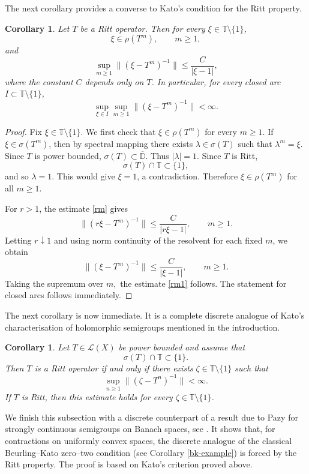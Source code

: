 \documentclass[11pt]{amsart}
\numberwithin{equation}{section}
\newtheorem{corollary}[theorem]{Corollary}
\theoremstyle{definition}
\theoremstyle{plain}
\def\T{\mathbb{T}}
\def\L{L}
\renewcommand{\L}{\mathcal L}
\begin{document}
 The next corollary provides a converse to Kato's condition for the Ritt property.
\begin{corollary}\label{ritt_converse}
Let $T$ be a Ritt operator. 
Then for every $\xi\in\mathbb T \setminus\{1\}$,
\[
  \xi\in\rho (T^m),\qquad m\ge1,
\]
and
\begin{equation}\label{rm1}
  \sup_{m\ge1}\|(\xi -T^m)^{-1}\|
  \le \frac{C}{|\xi-1|},
\end{equation}
where the constant $C$ depends only on $T$. In particular, for
every closed arc $I\subset\mathbb T\setminus\{1\}$,
\[
  \sup_{\xi\in I}\sup_{m\ge1}\|(\xi -T^m)^{-1}\|<\infty .
\]
\end{corollary}
\begin{proof}
Fix $\xi\in\mathbb T \setminus\{1\}$. We first check that
$\xi\in\rho (T^m)$ for every $m\ge1$. If
$\xi\in\sigma(T^m)$, then by spectral mapping there exists
$\lambda\in\sigma(T)$ such that
\(
  \lambda^m=\xi .
\)
Since $T$ is power bounded, $\sigma(T)\subset\overline{\mathbb D}$.
Thus $|\lambda|=1$. Since $T$ is Ritt,
\[
  \sigma(T)\cap\mathbb T \subset\{1\},
\]
and so $\lambda=1$. This would give $\xi=1$, a contradiction.
Therefore $\xi\in\rho (T^m)$ for all $m\ge1$.

For $r>1$, the estimate \eqref{rm} gives
\[
  \|(r\xi -T^m)^{-1}\|
  \le \frac{C}{|r\xi-1|},
  \qquad m\ge1.
\]
Letting $r\downarrow1$ and using norm continuity of the resolvent for
each fixed $m$, we obtain
\[
  \|(\xi -T^m)^{-1}\|
  \le \frac{C}{|\xi-1|},
  \qquad m\ge1.
\]
Taking the supremum over $m,$  the estimate \eqref{rm1} follows. The statement
for closed arcs follows immediately.
\end{proof}

The next corollary is now immediate. It is a complete discrete analogue of Kato's
characterisation of holomorphic semigroups mentioned in the introduction.

\begin{corollary}\label{DisKato}
Let $T\in\L(X)$ be power bounded and assume that
\[
        \sigma(T)\cap\T\subset\{1\}.
\]
Then $T$ is a Ritt operator if and only if there exists
$\zeta\in\T\setminus\{1\}$ such that
\begin{equation}\label{kato_ness}
        \sup_{n\ge1}\|(\zeta -T^n)^{-1}\|<\infty.
\end{equation}
If $T$ is Ritt, then this estimate holds for every
$\zeta\in\T\setminus\{1\}$.
\end{corollary}


We finish this subsection with a discrete counterpart of a result due to Pazy for
strongly continuous semigroups on Banach spaces, see \cite[Chapter~2.5, Corollary~5.8]{Pazy}.
It shows that, for contractions
on uniformly convex spaces, the discrete analogue of the classical
Beurling--Kato zero--two condition (see Corollary \ref{bk-example}) is forced by the Ritt property. The proof is based on Kato's criterion proved above.
\end{document}
